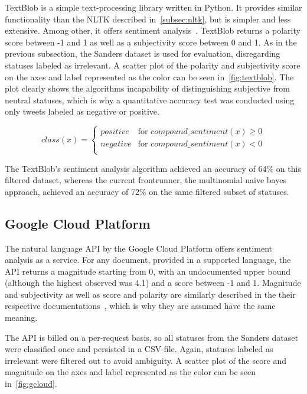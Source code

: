 TextBlob is a simple text-processing library written in Python.
It provides similar functionality than the NLTK described in~\cref{subsec:nltk},
but is simpler and less extensive.
Among other, it offers sentiment analysis~\cite{textblobDocs}.
TextBlob returns a polarity score between -1 and 1 as well as a subjectivity score between 0 and 1.
As in the previous subsection, the Sanders dataset is used for evaluation, disregarding statuses labeled as irrelevant.
A scatter plot of the polarity and subjectivity score on the axes and label represented as the color can be seen in~\cref{fig:textblob}.
The plot clearly shows the algorithms incapability of distinguishing subjective from neutral statuses,
which is why a quantitative accuracy test was conducted using only tweets labeled as negative or positive.

\begin{equation}
    class(x) =
    \begin{cases}
        positive & \text{for } compound\_sentiment(x) \geq 0 \\
        negative & \text{for } compound\_sentiment(x) < 0\\
    \end{cases}
\end{equation}

The TextBlob's sentiment analysis algorithm achieved an accuracy of 64\% on this filtered dataset,
whereas the current frontrunner, the multinomial naive bayes approach,
achieved an accuracy of 72\% on the same filtered subset of statuses.

\subsection{Google Cloud Platform}
\label{subsec:googlecloud}

The natural language API by the Google Cloud Platform offers sentiment analysis as a service.
For any document, provided in a supported language, the API returns a magnitude starting from 0, with an undocumented upper bound
(although the highest observed was 4.1) and a score between -1 and 1.
Magnitude and subjectivity as well as score and polarity are similarly described in the their respective documentations~\cite{gcloudDocs}\cite{textblobDocs},
which is why they are assumed have the same meaning.

The API is billed on a per-request basis, so all statuses from the Sanders dataset were classified once and persisted in a CSV-file.
Again, statuses labeled as irrelevant were filtered out to avoid ambiguity.
A scatter plot of the score and magnitude on the axes and label represented as the color can be seen in~\cref{fig:gcloud}.

